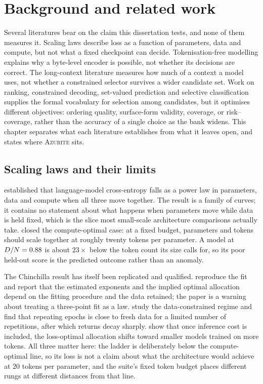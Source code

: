 \chapter{Background and related work}
\label{ch:background}

Several literatures bear on the claim this dissertation tests, and none of them
measures it. Scaling laws describe loss as a function of parameters, data and
compute, but not what a fixed checkpoint can decide. Tokenisation-free modelling
explains why a byte-level encoder is possible, not whether its decisions are
correct. The long-context literature measures how much of a context a model uses,
not whether a constrained selector survives a wider candidate set. Work on
ranking, constrained decoding, set-valued prediction and selective classification
supplies the formal vocabulary for selection among candidates, but it optimises
different objectives: ordering quality, surface-form validity, coverage, or
risk--coverage, rather than the accuracy of a single choice as the bank widens.
This chapter separates what each literature establishes from what it leaves open,
and states where \textsc{Azurite} sits.

\section{Scaling laws and their limits}

\citet{kaplan2020scaling} established that language-model cross-entropy falls as
a power law in parameters, data and compute when all three move together. The
result is a family of curves; it contains no statement about what happens when
parameters move while data is held fixed, which is the slice most small-scale
architecture comparisons actually take. \citet{hoffmann2022chinchilla} closed the
compute-optimal case: at a fixed budget, parameters and tokens should scale
together at roughly twenty tokens per parameter. A model at $D/N = 0.88$ is about
$23\times$ below the token count its size calls for, so its poor held-out score is
the predicted outcome rather than an anomaly.

The Chinchilla result has itself been replicated and qualified.
\citet{besiroglu2024replication} reproduce the fit and report that the estimated
exponents and the implied optimal allocation depend on the fitting procedure and
the data retained; the paper is a warning about treating a three-point fit as a
law. \citet{muennighoff2023data} study the data-constrained regime and find that
repeating epochs is close to fresh data for a limited number of repetitions,
after which returns decay sharply. \citet{sardana2023beyond} show that once
inference cost is included, the loss-optimal allocation shifts toward smaller
models trained on more tokens. All three matter here: the ladder is deliberately
below the compute-optimal line, so its loss is not a claim about what the
architecture would achieve at $20$ tokens per parameter, and the suite's fixed
token budget places different rungs at different distances from that line.

